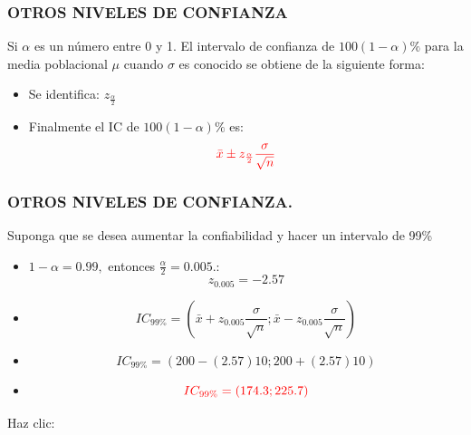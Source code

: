 \documentclass{beamer}
\begin{document}

\begin{frame}
\frametitle{OTROS NIVELES DE CONFIANZA}
Si $\alpha$ es un número entre 0 y 1. El intervalo de confianza de $100(1-\alpha)\%$ para la media poblacional $\mu$ cuando $\sigma$ es conocido se obtiene de la siguiente forma:

\begin{itemize}
\item Se identifica: $z_{\frac{\alpha}{2}}$
\item Finalmente el IC de $100(1-\alpha)\%$ es: $$\color{red}{\bar{x} \pm z_{\frac{\alpha}{2}}\frac{\sigma}{\sqrt{n}}}$$
\end{itemize}
\end{frame}



\begin{frame}
\frametitle{OTROS NIVELES DE CONFIANZA. }
 Suponga que se desea aumentar la confiabilidad y hacer un intervalo de 99\%

\begin{itemize}
\item $1-\alpha=0.99,$ entonces $\frac{\alpha}{2}=0.005$.: $$z_{0.005}=-2.57$$
\item $$IC_{99\%}=(\bar{x}+z_{0.005}\frac{\sigma}{\sqrt{n}};\bar{x}-z_{0.005}\frac{\sigma}{\sqrt{n}})$$
\item $$IC_{99\%}=(200-(2.57)10;200+(2.57)10)$$
\item $$\color{red}{IC_{99\%}=(174.3;225.7)}$$
\end{itemize}

      Haz clic: %
      \href{https://docs.google.com/spreadsheets/d/1xAh-TitIncHH8uwblbpvgjYma7B6gUTWlk8C2z1BquQ/edit?usp=sharing}{}
\end{frame}
\end{document}
